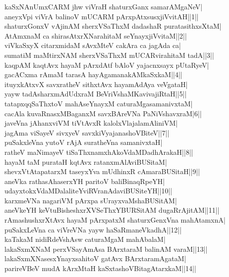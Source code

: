\documentclass{article}
\begin{document}
kaSxNAnUmxCARM j{hw} viVraH shaturxGanx samarAMgaNeV|\\
aneyxVpi viVrA balinoV mUCARM pArxpAtxsusxjiVvitAH||1||\\
shaturxGonxV vAjinAM sherxVSaThxM dadashaR puratasithxsXtaM|\\
AtAmxnaM ca shirasAtxrXNarahitaM seYnayxjiVvitaM||2||\\
viVkaSxyX citarxmidaM sAvxMteV cakAra ca jagAda ca|\\
sumatiM maMtirxNAM sherxVSaThxM mUCARvirahitaM tadA||3||\\
kaqpAM kaqtAvx hayaM pArxdAtf bAloV yajacnxsayx pUtaRyeV|\\
gacACxma rAmaM tarasA hayAgamanakAMkaSxkaM||4||\\
ituyxkAtxvX savxratheV sithxtAvx hayamAdAya veVgataH|\\
yayw tadAsharxmAdUdxraM BeVriVshaMKavivajiRtaH||5||\\
tatapxqqSaThxtoV mahAseYnayxM caturaMgasamanivxtaM|\\
cacAla kuvaRnasxMBaganxM savxBAreVNa PaNiVshavxraM|6||\\
javeVna jAhanxviVM tiVtAvxR kalolxVlajalamAliniVM|\\
jagAma viSayeV sivxyeV savxkiVyajanashoVBiteV||7||\\
puSakxleVna yutoV rAjA suratheVna samanivxtaH|\\
ratheV maNimayeV tiSaThxnamxhAkoVdaMDadhArakaH||8||\\
hayaM taM purataH kqtAvx ratanxmAlAviBUSitaM|\\
shevxVtAtapatarxM taseyxYva mUdhinxR cAmaraBUSitaH||9||\\
aneVka rathasAhaserxYH paritoV baliBinaqRpeYH|\\
udayxtokxVdaMDalaliteYviRVranAdaviBUSiteYH||10||\\
karxmeVNa nagariVM pArxpa sUrayxvaMshaBUSitAM|\\
aneVkeYH keVtuBisheshxrXVSeThxYBURSitAM dugaRrAjitAM||11||\\
rAmashushxrXtAvx hayaM pArxpatxM shaturxGenxVna mahAtamxnA|\\
puSakxLeVna ca viVreVNa yayw haSaRmaneVkadhA||12||\\
kaTakaM nidiRdeVshAsw caturaMgaM mahAbalaM|\\
lakaSxmXNaM perxVSayAmAsa BArxtaraM balinAM varaM||13||\\
lakaSxmXNasesxYnayxsahitoV gatAvx BArxtaramAgataM|\\
parireVBeV mudA kArxMtaH kaSxtashoVBitagAtarxkaM||14||\\
\end{document}
